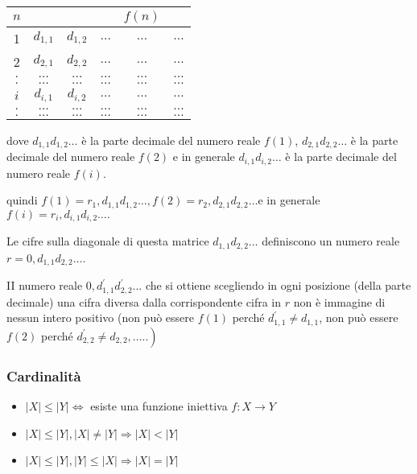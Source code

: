 \begin{center}
\begin{tabular}{c|ccccc}
$n$ & & & & $f(n)$ & \\
\hline 1 & $d_{1,1}$ & $d_{1,2}$ & $\ldots$ & $\ldots$ & $\ldots$ \\
2 & $d_{2,1}$ & $d_{2,2}$ & $\ldots$ & $\ldots$ & $\ldots$ \\
$.$ & $\ldots$ & $\ldots$ & $\ldots$ & $\ldots$ & $\ldots$ \\
$.$ & $\ldots$ & $\ldots$ & $\ldots$ & $\ldots$ & $\ldots$ \\
$i$ & $d_{i, 1}$ & $d_{i, 2}$ & $\ldots$ & $\ldots$ & $\ldots$ \\
$.$ & $\ldots$ & $\ldots$ & $\ldots$ & $\ldots$ & $\ldots$ \\
$.$ & $\ldots$ & $\ldots$ & $\ldots$ & $\ldots$ & $\ldots$
\end{tabular}
\end{center}


dove $d_{1,1} d_{1,2} \ldots$ è la parte decimale del numero reale $f(1)$, $d_{2,1} d_{2,2} \ldots$ è la parte decimale del numero reale $f(2)$ e in generale $d_{i, 1} d_{i, 2} \ldots$ è la parte decimale del numero reale $f(i)$.

\vspace{5mm}


quindi $f(1)=r_{1}, d_{1,1} d_{1,2} \ldots, f(2)=r_{2}, d_{2,1} d_{2,2} \ldots \mathrm{e}$ in generale $f(i)=r_{i}, d_{i, 1} d_{i, 2} \ldots .$

Le cifre sulla diagonale di questa matrice $d_{1,1} d_{2,2} \ldots$ definiscono un numero reale $r=0, d_{1,1} d_{2,2} \ldots$.

II numero reale $0, d_{1,1}^{\prime} d_{2,2}^{\prime} \ldots$ che si ottiene scegliendo in ogni posizione (della parte decimale) una cifra diversa dalla corrispondente cifra in $r$ non è immagine di nessun intero positivo (non può essere $f(1)$ perché $d_{1,1}^{\prime} \neq d_{1,1}$, non può essere $f(2)$ perché $\left.d_{2,2}^{\prime} \neq d_{2,2}, \ldots . .\right)$

\subsubsection{Cardinalità}
\begin{itemize}
    \item $|X| \leq|Y| \Leftrightarrow$ esiste una funzione iniettiva $f: X \rightarrow Y$
    \item $|X| \leq|Y|,|X| \neq|Y| \Rightarrow|X|<|Y|$
    \item $|X| \leq|Y|,|Y| \leq|X| \Rightarrow|X|=|Y|$
\end{itemize}

